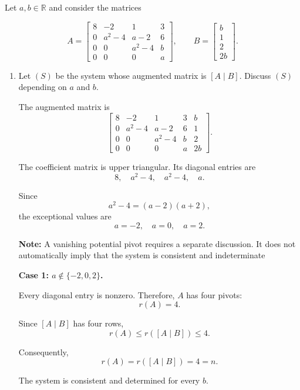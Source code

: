 
\item Let $a,b\in\mathbb{R}$ and consider the matrices

$$
A=
\begin{bmatrix}
8&-2&1&3\\
0&a^2-4&a-2&6\\
0&0&a^2-4&b\\
0&0&0&a
\end{bmatrix},
\qquad
B=
\begin{bmatrix}
b\\1\\2\\2b
\end{bmatrix}.
$$

\begin{enumerate}[label=\alph*)]

\item Let $(S)$ be the system whose augmented matrix is $[A\mid B]$.
Discuss $(S)$ depending on $a$ and $b$.

\begin{answer}
    The augmented matrix is
    $$
    \left[
    \begin{array}{cccc|c}
    8&-2&1&3&b\\
    0&a^2-4&a-2&6&1\\
    0&0&a^2-4&b&2\\
    0&0&0&a&2b
    \end{array}
    \right].
    $$

    The coefficient matrix is upper triangular. Its diagonal entries are
    $$
    8,\quad a^2-4,\quad
    a^2-4,\quad a.
    $$

    Since
    $$
    a^2-4=(a-2)(a+2),
    $$
    the exceptional values are
    $$
    \boxed{a=-2,\quad a=0,\quad a=2.}
    $$

    {\color{red}
    \textbf{Note:} A vanishing potential pivot requires a separate discussion.
    It does not automatically imply that the system is consistent and indeterminate}

    \textbf{Case 1:
    $a\notin\{-2,0,2\}$.}

    Every diagonal entry is nonzero.
    Therefore, $A$ has four pivots:
    $$
    r(A)=4.
    $$

    Since $[A\mid B]$ has four rows,
    $$
    r(A)\leq r([A\mid B])\leq4.
    $$

    Consequently,
    $$
    r(A)=r([A\mid B])=4=n.
    $$

    The system is consistent and determined for every $b$.


\end{answer}
\end{enumerate}
